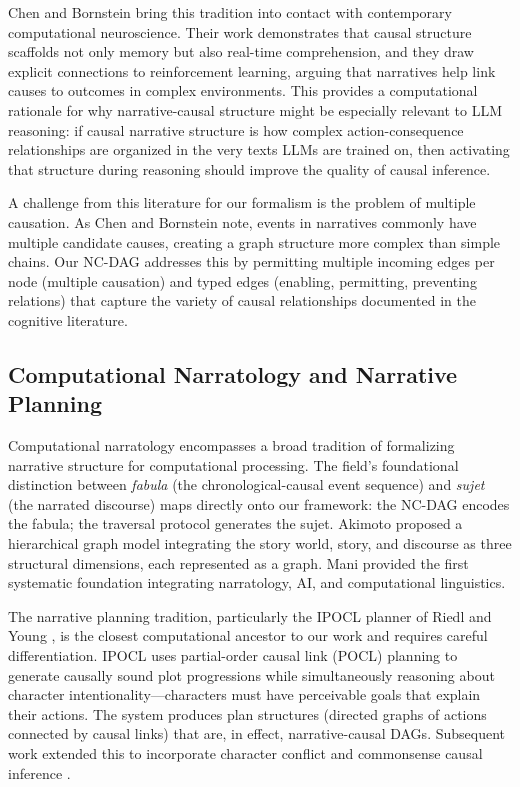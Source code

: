 \documentclass[11pt,letterpaper]{article}
\theoremstyle{defn}
\begin{document}
Chen and Bornstein \citeyearpar{chen2024causal} bring this tradition into contact with contemporary computational neuroscience. Their work demonstrates that causal structure scaffolds not only memory but also real-time comprehension, and they draw explicit connections to reinforcement learning, arguing that narratives help link causes to outcomes in complex environments. This provides a computational rationale for why narrative-causal structure might be especially relevant to LLM reasoning: if causal narrative structure is how complex action-consequence relationships are organized in the very texts LLMs are trained on, then activating that structure during reasoning should improve the quality of causal inference.

A challenge from this literature for our formalism is the problem of multiple causation. As Chen and Bornstein note, events in narratives commonly have multiple candidate causes, creating a graph structure more complex than simple chains. Our NC-DAG addresses this by permitting multiple incoming edges per node (multiple causation) and typed edges (enabling, permitting, preventing relations) that capture the variety of causal relationships documented in the cognitive literature.

\subsection{Computational Narratology and Narrative Planning}

Computational narratology encompasses a broad tradition of formalizing narrative structure for computational processing. The field's foundational distinction between \textit{fabula} (the chronological-causal event sequence) and \textit{sujet} (the narrated discourse) maps directly onto our framework: the NC-DAG encodes the fabula; the traversal protocol generates the sujet. Akimoto \citeyearpar{akimoto2017} proposed a hierarchical graph model integrating the story world, story, and discourse as three structural dimensions, each represented as a graph. Mani \citeyearpar{mani2013} provided the first systematic foundation integrating narratology, AI, and computational linguistics.

The narrative planning tradition, particularly the IPOCL planner of Riedl and Young \citeyearpar{riedl2010}, is the closest computational ancestor to our work and requires careful differentiation. IPOCL uses partial-order causal link (POCL) planning to generate causally sound plot progressions while simultaneously reasoning about character intentionality---characters must have perceivable goals that explain their actions. The system produces plan structures (directed graphs of actions connected by causal links) that are, in effect, narrative-causal DAGs. Subsequent work extended this to incorporate character conflict \citep{ware2011} and commonsense causal inference \citep{ammanabrolu2021}.
\end{document}
